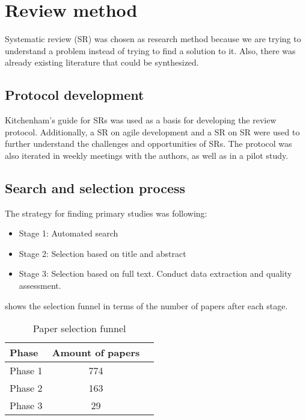 \documentclass{sig-alternate}
\begin{document}
\section{Review method}
\label{sec:Method}
Systematic review (SR) was chosen as research method because we are trying to
understand a problem instead of trying to find a solution to it. Also, there was already
existing literature that could be synthesized.

\subsection{Protocol development}
Kitchenham's guide for SRs \cite{kitchenham2004procedures} was used as a basis
for developing the review protocol. Additionally, a SR on agile development
\cite{dyba_empirical_2008} and a SR on SR \cite{kitchenham2013systematic} were
used to further understand the challenges and opportunities of SRs. The
protocol was also iterated in weekly meetings with the authors, as well as in a pilot study.

\subsection{Search and selection process}

The strategy for finding primary studies was following:

\begin{itemize}
  \item Stage 1: Automated search
  \item Stage 2: Selection based on title and abstract
  \item Stage 3: Selection based on full text. Conduct data
  extraction and quality assessment.
\end{itemize}

 shows the selection funnel in terms of the number
of papers after each stage.


\begin{table}
\centering
\caption{Paper selection funnel}
\begin{tabular}{lcr} \hline
\label{SelectionFunnel}
Phase & Amount of papers \\ \hline
Phase 1 & 774 \\  
Phase 2 & 163 \\ 
Phase 3 & 29\\
\hline
\end{tabular}
\end{table}
\end{document}
